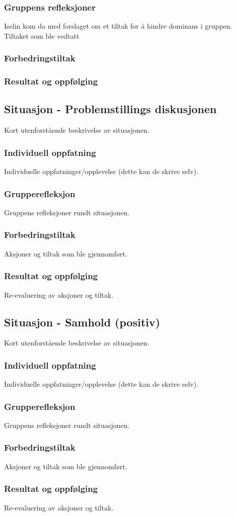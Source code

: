 \subsubsection{Gruppens refleksjoner}
Iselin kom da med forslaget om et tiltak for å hindre dominans i gruppen. Tiltaket som ble vedtatt 
\subsubsection{Forbedringstiltak}

\subsubsection{Resultat og oppfølging}




\subsection{Situasjon - Problemstillings diskusjonen}
Kort utenforstående beskrivelse av situasjonen.
\subsubsection{Individuell oppfatning}
Individuelle oppfatninger/opplevelse (dette kan de skrive selv).
\subsubsection{Grupperefleksjon}
Gruppens refleksjoner rundt situasjonen.
\subsubsection{Forbedringstiltak}
Aksjoner og tiltak som ble gjennomført.
\subsubsection{Resultat og oppfølging}
Re-evaluering av aksjoner og tiltak.

\subsection{Situasjon - Samhold (positiv)}
Kort utenforstående beskrivelse av situasjonen.
\subsubsection{Individuell oppfatning}
Individuelle oppfatninger/opplevelse (dette kan de skrive selv).
\subsubsection{Grupperefleksjon}
Gruppens refleksjoner rundt situasjonen.
\subsubsection{Forbedringstiltak}
Aksjoner og tiltak som ble gjennomført.
\subsubsection{Resultat og oppfølging}
Re-evaluering av aksjoner og tiltak.
